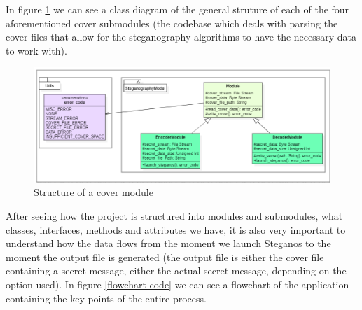 In figure \ref{cover_module_overview} we can see a class diagram of the general struture of each of the four aforementioned cover submodules (the codebase which deals with parsing the cover files that allow for the steganography algorithms to have the necessary data to work with). 

\begin{figure}[H]
    \centering
    \includegraphics[width=16cm,keepaspectratio]{pics/application_chapter/diagrama_module_interface}
    \caption{Structure of a cover module}
    \label{cover_module_overview}
\end{figure}

After seeing how the project is structured into modules and submodules, what classes, interfaces, methods and attributes we have, it is also very important to understand how the data flows from the moment we launch Steganos to the moment the output file is generated (the output file is either the cover file containing a secret message, either the actual secret message, depending on the option used). In figure \ref{flowchart-code} we can see a flowchart of the application containing the key points of the entire process.

